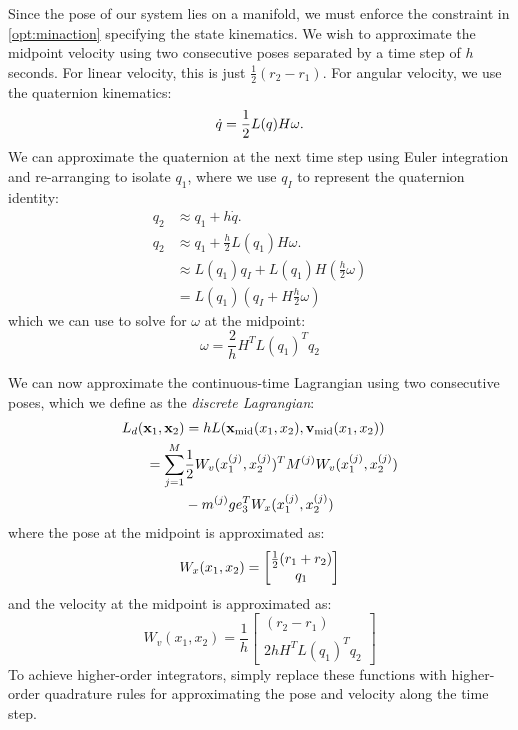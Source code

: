 \documentclass[../root.tex]{subfiles}
\begin{document}
Since the pose of our system lies on a manifold, we must enforce the constraint in 
\eqref{opt:minaction} specifying the state kinematics. We wish to approximate the midpoint 
velocity using two consecutive poses separated by a time step of $h$ seconds. For linear 
velocity, this is just $\frac{1}{2} (r_2 - r_1)$. For angular velocity, we use the quaternion
kinematics:
\begin{equation}
    \dot{q} = \frac{1}{2} L(q) H \omega.
\end{equation}
We can approximate the quaternion at the next time step using Euler integration and 
re-arranging to isolate $q_1$, where we use $q_I$ to represent the quaternion identity:
\begin{subequations}
    \begin{align}
        q_{2} &\approx q_1 + h \dot{q}. \\
        q_{2} &\approx q_1 + \frac{h}{2} L(q_1) H \omega. \\
        &\approx L(q_1) q_I + L(q_1) H \left(\frac{h}{2} \omega\right) \\
        &= L(q_1) \left(q_I + H \frac{h}{2} \omega\right)
    \end{align}
\end{subequations}
which we can use to solve for $\omega$ at the midpoint:
\begin{equation}
    \omega = \frac{2}{h} H^T L(q_1)^T q_2
\end{equation}

We can now approximate the continuous-time Lagrangian using two consecutive poses, which we
define as the \textit{discrete Lagrangian}:
\begin{subequations}
    \begin{align}
        L_d(\mathbf{x}_1, \mathbf{x}_2) 
            &= h L(\mathbf{x}_\text{mid}(x_1, x_2), \mathbf{v}_\text{mid}(x_1, x_2)) \\
        = \sum_{j=1}^M &\frac{1}{2} W_v(x_1^{(j)}, x_2^{(j)})^T M^{(j)} W_v(x_1^{(j)}, x_2^{(j)}) \nonumber \\
        &- m^{(j)} g e_3^T W_x(x_1^{(j)}, x_2^{(j)}) \label{eq:discrete_lagrangian}
    \end{align}
\end{subequations}
where the pose at the midpoint is approximated as:
\begin{equation} \label{eq:quad_pose}
    W_x(x_1, x_2) = \begin{bmatrix}
        \frac{1}{2} (r_1 + r_2) \\ q_1
    \end{bmatrix}
\end{equation}
and the velocity at the midpoint is approximated as:
\begin{equation} \label{eq:quad_vel}
    W_v(x_1, x_2) = \frac{1}{h} \begin{bmatrix}
        (r_2 - r_1) \\ 
        2{h} H^T L(q_1)^T q_2
    \end{bmatrix}
\end{equation}
To achieve higher-order integrators, simply replace these functions with higher-order 
quadrature rules for approximating the pose and velocity along the time step.
\end{document}
